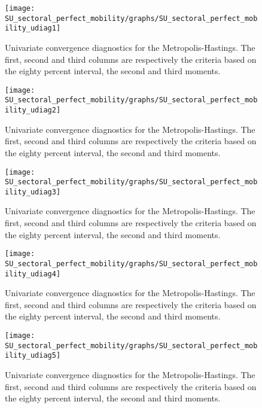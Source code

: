  
\begin{figure}[H]
\centering 
\texttt{[image: SU\_sectoral\_perfect\_mobility/graphs/SU\_sectoral\_perfect\_mobility\_udiag1]}
\caption{Univariate convergence diagnostics for the Metropolis-Hastings.
The first, second and third columns are respectively the criteria based on
the eighty percent interval, the second and third moments.}\label{Fig:UnivariateDiagnostics:1}
\end{figure}

\begin{figure}[H]
\centering 
\texttt{[image: SU\_sectoral\_perfect\_mobility/graphs/SU\_sectoral\_perfect\_mobility\_udiag2]}
\caption{Univariate convergence diagnostics for the Metropolis-Hastings.
The first, second and third columns are respectively the criteria based on
the eighty percent interval, the second and third moments.}\label{Fig:UnivariateDiagnostics:2}
\end{figure}

\begin{figure}[H]
\centering 
\texttt{[image: SU\_sectoral\_perfect\_mobility/graphs/SU\_sectoral\_perfect\_mobility\_udiag3]}
\caption{Univariate convergence diagnostics for the Metropolis-Hastings.
The first, second and third columns are respectively the criteria based on
the eighty percent interval, the second and third moments.}\label{Fig:UnivariateDiagnostics:3}
\end{figure}

\begin{figure}[H]
\centering 
\texttt{[image: SU\_sectoral\_perfect\_mobility/graphs/SU\_sectoral\_perfect\_mobility\_udiag4]}
\caption{Univariate convergence diagnostics for the Metropolis-Hastings.
The first, second and third columns are respectively the criteria based on
the eighty percent interval, the second and third moments.}\label{Fig:UnivariateDiagnostics:4}
\end{figure}

\begin{figure}[H]
\centering 
\texttt{[image: SU\_sectoral\_perfect\_mobility/graphs/SU\_sectoral\_perfect\_mobility\_udiag5]}
\caption{Univariate convergence diagnostics for the Metropolis-Hastings.
The first, second and third columns are respectively the criteria based on
the eighty percent interval, the second and third moments.}\label{Fig:UnivariateDiagnostics:5}
\end{figure}

